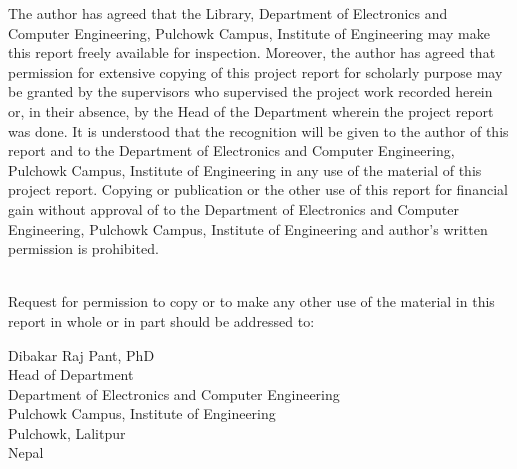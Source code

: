\thispagestyle{plain}
\begin{center}
	\large
	\vspace{0.4cm}
\end{center}

The author has agreed that the Library, Department of Electronics and Computer Engineering, Pulchowk Campus, Institute of Engineering may make this report freely available for inspection. Moreover, the author has agreed that permission for extensive copying of this project report for scholarly purpose may be granted by the supervisors who supervised the project work recorded herein or, in their absence, by the Head of the Department wherein the project report was done. It is understood that the recognition will be given to the author of this report and to the Department of Electronics and Computer Engineering, Pulchowk Campus, Institute of Engineering in any use of the material of this project report. Copying or publication or the other use of this report for financial gain without approval of to the Department of Electronics and Computer Engineering, Pulchowk Campus, Institute of Engineering and author’s written permission is prohibited.\\
\\
\hspace{0.2cm}

Request for permission to copy or to make any other use of the material in this report in whole or in part should be addressed to:


\vspace{0.2cm}
\begin{flushleft}

Dibakar Raj Pant, PhD\\
Head of Department\\
Department of Electronics and Computer Engineering\\
Pulchowk Campus, Institute of Engineering\\
Pulchowk, Lalitpur\\
Nepal
\end{flushleft}

